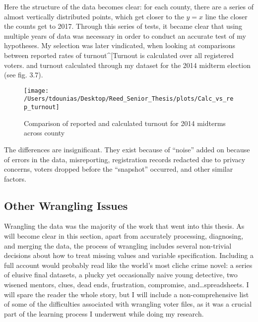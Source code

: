 \documentclass[12pt,twoside]{reedthesis}
\begin{document}
  Here the structure of the data becomes clear: for each county, there are
  a series of almost vertically distributed points, which get closer to
  the \(y=x\) line the closer the counts get to 2017. Through this series
  of tests, it became clear that using multiple years of data was
  necessary in order to conduct an accurate test of my hypotheses. My
  selection was later vindicated, when looking at comparisons between
  reported rates of turnout\^{}{[}Turnout is calculated over all
  registered voters. and turnout calculated through my dataset for the
  2014 midterm election (see fig. 3.7).
  
  \begin{figure}
  
  {\centering \texttt{[image: /Users/tdounias/Desktop/Reed\_Senior\_Thesis/plots/Calc\_vs\_rep\_turnout]} 
  
  }
  
  \caption[Comparison of reported and calculated turnout for 2014 midterms across county]{Comparison of reported and calculated turnout for 2014 midterms across county}\label{fig:comp turnout 2014}
  \end{figure}
  
  The differences are insignificant. They exist because of ``noise'' added
  on because of errors in the data, misreporting, registration records
  redacted due to privacy concerns, voters dropped before the ``snapshot''
  occurred, and other similar factors.
  
  \subsection{Other Wrangling Issues}\label{other-wrangling-issues}
  
  Wrangling the data was the majority of the work that went into this
  thesis. As will become clear in this section, apart from accurately
  processing, diagnosing, and merging the data, the process of wrangling
  includes several non-trivial decisions about how to treat missing values
  and variable specification. Including a full account would probably read
  like the world's most cliche crime novel: a series of elusive final
  datasets, a plucky yet occasionally naive young detective, two wisened
  mentors, clues, dead ends, frustration, compromise,
  and\ldots{}spreadsheets. I will spare the reader the whole story, but I
  will include a non-comprehensive list of some of the difficulties
  associated with wrangling voter files, as it was a crucial part of the
  learning process I underwent while doing my research.
  
\end{document}
